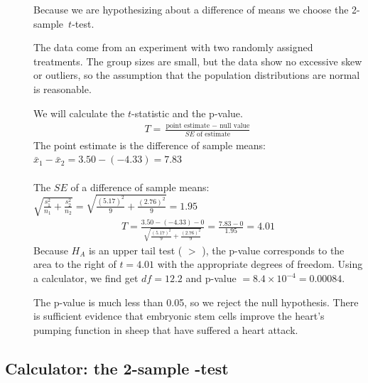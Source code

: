 \begin{examplewrap}
\begin{nexample}
\begin{description}
\item[] Because we are hypothesizing about a difference of means we choose the \mbox{2-sample $t$-test.}
\item[]  The data come from an experiment with two randomly assigned treatments.  The group sizes are small, but the data show no excessive skew or outliers, so the assumption that the population distributions are normal is reasonable.
\item[  ]  We will calculate the $t$-statistic and the p-value.
\begin{align*}
T = \frac{\text{point estimate } - \text{ null value}}{SE \text{ of estimate}}
\end{align*}
The point estimate is the difference of sample means: $ \bar{x}_{1} - \bar{x}_{2}=3.50 - (-4.33) = 7.83$\\
\\
The $SE$ of a difference of sample means: $\sqrt{\frac{s_1^2}{n_1} + \frac{s_2^2}{n_2}}= \sqrt{\frac{(5.17)^2}{9} + \frac{(2.76)^2}{9}} = 1.95$
\begin{align*}
T = \frac{3.50 - (-4.33) - 0}{\sqrt{\frac{(5.17)^2}{9} + \frac{(2.76)^2}{9}} } = \frac{7.83 - 0}{1.95} = 4.01 
\end{align*}
Because $H_A$ is an upper tail test ( $>$ ), the p-value corresponds to the area to the right of $t=4.01$ with the appropriate degrees of freedom.  Using a calculator, we find get $df=12.2$ and p-value $ = 8.4\times 10^{-4}=0.00084$.  
\item[]  The p-value is much less than 0.05, so we reject the null hypothesis. There is sufficient evidence that embryonic stem cells improve the heart's pumping function in sheep that have suffered a heart attack.

\end{description}

\end{nexample}
\end{examplewrap}


\D{\newpage}

\subsection[Calculator: the 2-sample $t$-test]{Calculator: the 2-sample -test}
\label{2SampTtest}

